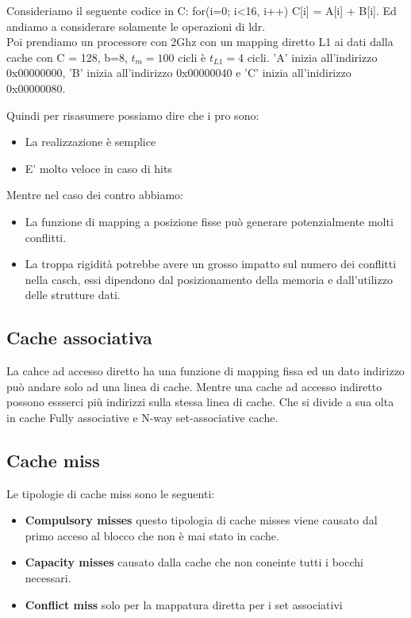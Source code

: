 \begin{example}
    Consideriamo il seguente codice in C: for(i=0; i<16, i++) C[i] = A[i] + B[i]. Ed andiamo a considerare solamente le operazioni di ldr.\\
    Poi prendiamo un processore con 2Ghz con un mapping diretto L1 ai dati dalla cache con C = 128, b=8, \(t_m = 100\) cicli è \(t_{L1} = 4\) cicli. 'A' inizia all'indirizzo 0x00000000, 
    'B' inizia all'indirizzo 0x00000040 e 'C' inizia all'inidirizzo 0x00000080. %
\end{example}

Quindi per risasumere possiamo dire che i pro sono:
\begin{itemize}
    \item La realizzazione è semplice
    \item E' molto veloce in caso di hits
\end{itemize}

Mentre nel caso dei contro abbiamo:
\begin{itemize}
    \item La funzione di mapping a posizione fisse può generare potenzialmente molti conflitti.
    \item La troppa rigidità potrebbe avere un grosso impatto sul numero dei conflitti nella casch, essi dipendono dal posizionamento della memoria e dall'utilizzo delle strutture dati.
\end{itemize}

\subsection{Cache associativa}
La cahce ad accesso diretto ha una funzione di mapping fissa ed un dato indirizzo può andare solo ad una linea di cache. Mentre una cache ad accesso indiretto possono essserci più indirizzi sulla stessa
linea di cache.
Che si divide a sua olta in cache Fully associative e N-way set-associative cache.\\


\subsection{Cache miss}
Le tipologie di cache miss sono le seguenti:
\begin{itemize}
    \item \textbf{Compulsory misses} questo tipologia di cache misses viene causato dal primo acceso al blocco che non è mai stato in cache.
    \item \textbf{Capacity misses} causato dalla cache che non coneinte tutti i bocchi necessari.
    \item \textbf{Conflict miss} solo per la mappatura diretta per i set associativi
\end{itemize}


